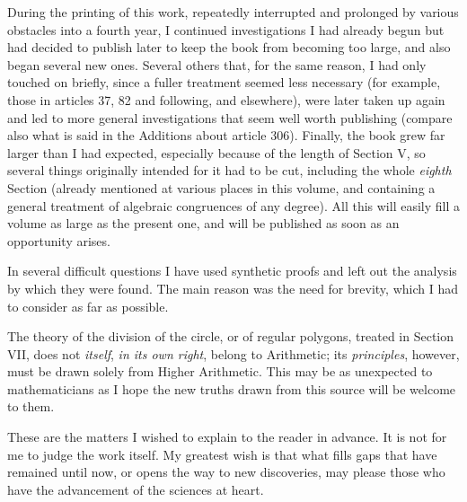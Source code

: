 During the printing of this work, repeatedly interrupted and prolonged by various obstacles into a fourth year, I continued investigations I had already begun but had decided to publish later to keep the book from becoming too large, and also began several new ones. Several others that, for the same reason, I had only touched on briefly, since a fuller treatment seemed less necessary (for example, those in articles 37, 82 and following, and elsewhere), were later taken up again and led to more general investigations that seem well worth publishing (compare also what is said in the Additions about article 306). Finally, the book grew far larger than I had expected, especially because of the length of Section V, so several things originally intended for it had to be cut, including the whole \emph{eighth} Section (already mentioned at various places in this volume, and containing a general treatment of algebraic congruences of any degree). All this will easily fill a volume as large as the present one, and will be published as soon as an opportunity arises.

In several difficult questions I have used synthetic proofs and left out the analysis by which they were found. The main reason was the need for brevity, which I had to consider as far as possible.

The theory of the division of the circle, or of regular polygons, treated in Section VII, does not \emph{itself}, \emph{in its own right}, belong to Arithmetic; its \emph{principles}, however, must be drawn solely from Higher Arithmetic. This may be as unexpected to mathematicians as I hope the new truths drawn from this source will be welcome to them.

These are the matters I wished to explain to the reader in advance. It is not for me to judge the work itself. My greatest wish is that what fills gaps that have remained until now, or opens the way to new discoveries, may please those who have the advancement of the sciences at heart.

